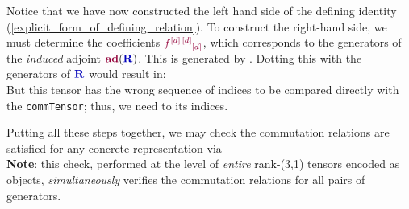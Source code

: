 \documentclass[12pt,a4paper]{article}\let\ifpdf\relax
\begin{document}
Notice that we have now constructed the left hand side of the defining identity (\ref{explicit_form_of_defining_relation}). To construct the right-hand side, we must determine the coefficients $\r{f}\indices{\r{[d]\,[d]}}{\r{[d]}}$, which corresponds to the generators of the \emph{induced} adjoint $\mathbf{\r{ad}}(\mathbf{\b{R}})$. This is generated by . Dotting this with the generators of $\mathbf{\b{R}}$ would result in:
%
~\\[-2pt]

%
\noindent But this tensor has the wrong sequence of indices to be compared directly with the \texttt{commTensor}; thus, we need to  its indices.

Putting all these steps together, we may check the commutation relations are satisfied for any concrete representation via
%
\\[-2pt]
%
\noindent \textbf{Note}: this check, performed at the level of \emph{entire} rank-(3,1) tensors encoded as  objects, \emph{simultaneously} verifies the commutation relations for all pairs of generators. 
\end{document}
